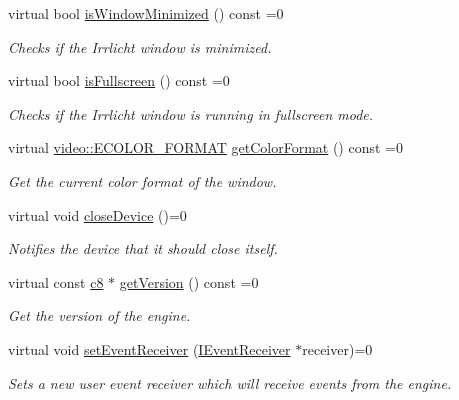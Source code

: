 \begin{DoxyCompactItemize}
virtual bool \hyperlink{classirr_1_1IrrlichtDevice_a69e96b9c49c65391e406377a92e795b1}{is\+Window\+Minimized} () const =0
\begin{DoxyCompactList}\small\item\em Checks if the Irrlicht window is minimized. \end{DoxyCompactList}\item 
virtual bool \hyperlink{classirr_1_1IrrlichtDevice_a409df5e9b9b90635bd3c2db31978a5c1}{is\+Fullscreen} () const =0
\begin{DoxyCompactList}\small\item\em Checks if the Irrlicht window is running in fullscreen mode. \end{DoxyCompactList}\item 
virtual \hyperlink{namespaceirr_1_1video_a1d5e487888c32b1674a8f75116d829ed}{video\+::\+E\+C\+O\+L\+O\+R\+\_\+\+F\+O\+R\+M\+AT} \hyperlink{classirr_1_1IrrlichtDevice_a9dccd3d7af7cfbabee46214a89bd6650}{get\+Color\+Format} () const =0
\begin{DoxyCompactList}\small\item\em Get the current color format of the window. \end{DoxyCompactList}\item 
virtual void \hyperlink{classirr_1_1IrrlichtDevice_a08c97937e0f60f98d443b397a7c60e18}{close\+Device} ()=0
\begin{DoxyCompactList}\small\item\em Notifies the device that it should close itself. \end{DoxyCompactList}\item 
virtual const \hyperlink{namespaceirr_a9395eaea339bcb546b319e9c96bf7410}{c8} $\ast$ \hyperlink{classirr_1_1IrrlichtDevice_a4eb5bc1b15f552ce2c37d792231392f7}{get\+Version} () const =0
\begin{DoxyCompactList}\small\item\em Get the version of the engine. \end{DoxyCompactList}\item 
virtual void \hyperlink{classirr_1_1IrrlichtDevice_abf71a5ed6bb6b287e769f699010cedf0}{set\+Event\+Receiver} (\hyperlink{classirr_1_1IEventReceiver}{I\+Event\+Receiver} $\ast$receiver)=0
\begin{DoxyCompactList}\small\item\em Sets a new user event receiver which will receive events from the engine. \end{DoxyCompactList}\item 

\end{DoxyCompactItemize}
